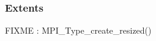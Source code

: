 \begin{frame}[containsverbatim]
%                                                                                    
%                                                                                    



\end{frame}

\begin{frame}[containsverbatim]
\frametitle{Extents}	
FIXME : MPI_Type_create_resized()
\end{frame}





